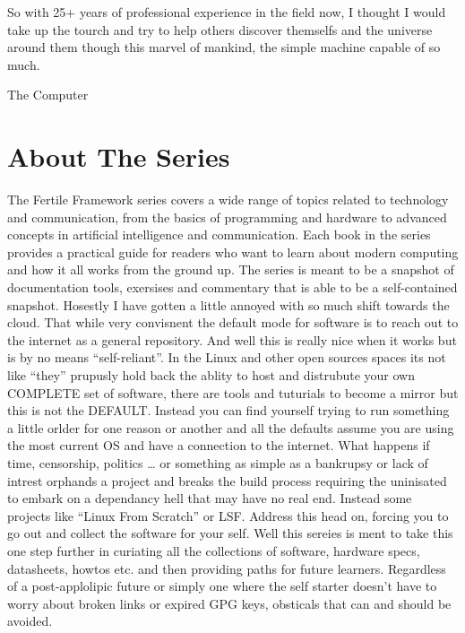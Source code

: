 So with 25+ years of professional experience in the field now, I thought I would take up the tourch and try to help others discover themselfs and the universe around them though this marvel of mankind, the simple machine capable of so much.

The Computer

\section{About The Series}

The Fertile Framework series covers a wide range of topics related to technology and communication, from the basics of programming and hardware to advanced concepts in artificial intelligence and communication. Each book in the series provides a practical guide for readers who want to learn about modern computing and how it all works from the ground up. 
The series is meant to be a snapshot of documentation tools, exersises and commentary that is able to be a self-contained snapshot. Hosestly I have gotten a little annoyed with so much shift towards the cloud. That while very convisnent the default mode for software is to reach out to the internet as a general repository. And well this is really nice when it works but is by no means “self-reliant”. In the Linux and other open sources spaces its not like “they” prupusly hold back the ablity to host and distrubute your own COMPLETE set of software, there are tools and tuturials to become a mirror but this is not the DEFAULT. Instead you can find yourself trying to run something a little orlder for one reason or another and all the defaults assume you are using the most current OS and have a connection to the internet. 
What happens if time, censorship, politics … or something as simple as a bankrupsy or lack of intrest orphands a project and breaks the build process requiring the uninisated to embark on a dependancy hell that may have no real end. Instead some projects like “Linux From Scratch” or LSF. Address this head on, forcing you to go out and collect the software for your self. Well this sereies is ment to take this one step further in curiating all the collections of software, hardware specs, datasheets, howtos etc. and then providing paths for future learners. Regardless of a post-applolipic future or simply one where the self starter doesn’t have to worry about broken links or expired GPG keys, obsticals that can and should be avoided. 
